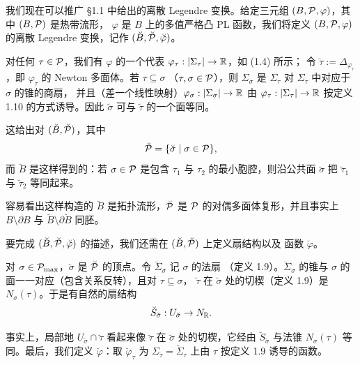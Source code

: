 我们现在可以推广 §1.1 中给出的离散 Legendre 变换。给定三元组 $(B,\mathcal{P},\varphi)$，其中 $(B,\mathcal{P})$ 是热带流形，
$\varphi$ 是 $B$ 上的多值严格凸 PL 函数，我们将定义 $(B,\mathcal{P},\varphi)$ 的离散 Legendre 变换，记作
$(\breve{B},\breve{\mathcal{P}},\breve{\varphi})$。

对任何 $\tau\in\mathcal{P}$，我们有 $\varphi$ 的一个代表 $\varphi_\tau : |\Sigma_\tau| \to \mathbb{R}$，如 (1.4) 所示；
令 $\breve{\tau} := \Delta_{\varphi_\tau}$，即 $\varphi_\tau$ 的 Newton 多面体。若 $\tau\subseteq\sigma$
（$\tau,\sigma\in\mathcal{P}$），则 $\Sigma_\sigma$ 是 $\Sigma_\tau$ 对 $\Sigma_\tau$ 中对应于 $\sigma$ 的锥的商扇，
并且（差一个线性映射）$\varphi_\sigma : |\Sigma_\sigma| \to \mathbb{R}$ 由 $\varphi_\tau : |\Sigma_\tau| \to \mathbb{R}$
按定义 1.10 的方式诱导。因此 $\breve{\sigma}$ 可与 $\breve{\tau}$ 的一个面等同。

这给出对 $(\breve{B},\breve{\mathcal{P}})$，其中
\[
\breve{\mathcal{P}} = \{\breve{\sigma} \mid \sigma\in\mathcal{P}\},
\]
而 $\breve{B}$ 是这样得到的：若 $\sigma\in\mathcal{P}$ 是包含 $\tau_1$ 与 $\tau_2$ 的最小胞腔，则沿公共面
$\breve{\sigma}$ 把 $\breve{\tau}_1$ 与 $\breve{\tau}_2$ 等同起来。

容易看出这样构造的 $\breve{B}$ 是拓扑流形，$\breve{\mathcal{P}}$ 是 $\mathcal{P}$ 的对偶多面体复形，并且事实上
$B\setminus\partial B$ 与 $\breve{B}\setminus\partial\breve{B}$ 同胚。

要完成 $(\breve{B},\breve{\mathcal{P}},\breve{\varphi})$ 的描述，我们还需在 $(\breve{B},\breve{\mathcal{P}})$ 上定义扇结构以及
函数 $\breve{\varphi}$。

对 $\sigma\in\mathcal{P}_{\max}$，$\breve{\sigma}$ 是 $\breve{\mathcal{P}}$ 的顶点。令 $\breve{\Sigma}_\sigma$ 记 $\sigma$ 的法扇
（定义 1.9）。$\breve{\Sigma}_\sigma$ 的锥与 $\sigma$ 的面一一对应（包含关系反转），且对 $\tau\subseteq\sigma$，
$\breve{\tau}$ 在 $\breve{\sigma}$ 处的切楔（定义 1.9）是 $N_\sigma(\tau)$。于是有自然的扇结构
\[
\breve{S}_{\breve{\sigma}} : U_{\breve{\sigma}} \to N_{\mathbb{R}}.
\]


事实上，局部地 $U_{\breve{\sigma}}\cap\breve{\tau}$ 看起来像 $\breve{\tau}$ 在 $\breve{\sigma}$ 处的切楔，它经由
$\breve{S}_{\breve{\sigma}}$ 与法锥 $N_\sigma(\tau)$ 等同。最后，我们定义 $\breve{\varphi}$：取
$\breve{\varphi}_\tau$ 为 $\Sigma_{\breve{\tau}} = \breve{\Sigma}_\tau$ 上由 $\tau$ 按定义 1.9 诱导的函数。

